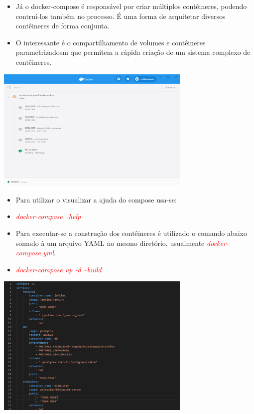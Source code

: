\documentclass[10pt]{beamer}
\theoremstyle{remark}
\theoremstyle{definition}
\newcommand{\code}[1]{\textcolor{red} {\textit{#1}}} %
\begin{document}
\begin{frame}[allowframebreaks]
	\framebreak
	
	\begin{itemize}
		\item Já o docker-compose é responsável por criar múltiplos contêineres, podendo contruí-los também no processo. É uma forma de arquitetar diversos contêineres de forma conjunta.
		\item O interessante é o compartilhamento de volumes e contêineres parametrizadosm que permitem a rápida criação de um sistema complexo de contêineres.
	\end{itemize}
	
	\framebreak
	
	\begin{center}
		\includegraphics[width=0.7\textwidth]{images/23.png}
	\end{center}
	
	\framebreak
	
	\begin{itemize}
		\item Para utilizar o visualizar a ajuda do compose usa-se:
		
		\item \code{docker-compose --help}
		
		\item Para executar-se a construção dos contêineres é utilizado o comando abaixo somado à um arquivo YAML no mesmo diretório, usualmente \code{docker-compose.yml}.
		
		\item \code{docker-compose up -d --build}
	\end{itemize}
	
	\framebreak
	
	\begin{center}
		\includegraphics[width=0.7\textwidth]{images/24.png}
	\end{center}
	

\end{frame}
\end{document}
